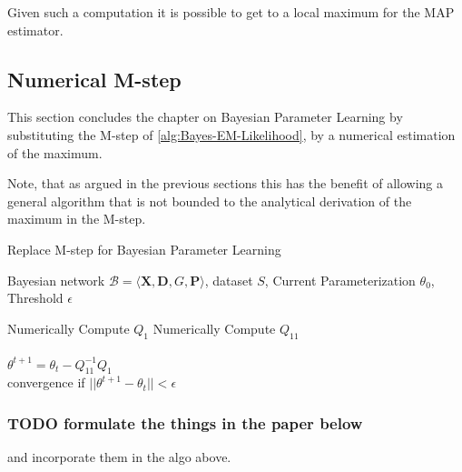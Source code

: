 \documentclass[11pt]{article}
\begin{document}
Given such a computation it is possible to get to a local maximum
for the MAP estimator.


\subsection{Numerical M-step}
\label{sec:org6baae90}

This section concludes the chapter on Bayesian Parameter Learning
by substituting the M-step of \ref{alg:Bayes-EM-Likelihood}, by a
numerical estimation of the maximum.

Note, that as argued in the previous sections this has the benefit
of allowing a general algorithm that is not bounded to the
analytical derivation of the maximum in the M-step.

\begin{algorithm*}[h!]
\caption{Replace M-step for Bayesian Parameter Learning}
\label{alg:Numerical-M-Step}
\vspace{-10pt}
\begin{multicols}{2}
\begin{algorithmic}[1] 
\Require Bayesian network $\mathcal{B}=\langle \mathbf{X},\mathbf{D}, G, \mathbf{P} \rangle$, dataset $S$, Current Parameterization $\theta_0$, Threshold $\epsilon$

   \State Numerically Compute $Q_1$
   \State Numerically Compute $Q_{11}$\\

   \\
      \State $\theta^{t+1}= \theta_{t} - Q_{11}^{-1} Q_1$\\
      \State convergence if $||\theta^{t+1} - \theta_{t}|| < \epsilon$
   \EndForAll
\end{algorithmic}
\end{multicols}
\end{algorithm*}


\subsubsection{{\bfseries\sffamily TODO} formulate the things in the paper below}
\label{sec:org175accd}

and incorporate them in the algo above.
\end{document}
